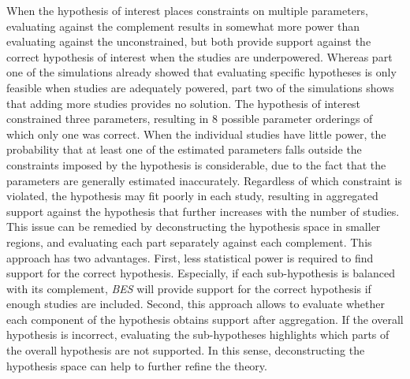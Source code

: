 \documentclass[
  authoryear,
  preprint,
  5p,
  twocolumn]{elsarticle}
\begin{document}
When the hypothesis of interest places constraints on multiple
parameters, evaluating against the complement results in somewhat more
power than evaluating against the unconstrained, but both provide
support against the correct hypothesis of interest when the studies are
underpowered. Whereas part one of the simulations already showed that
evaluating specific hypotheses is only feasible when studies are
adequately powered, part two of the simulations shows that adding more
studies provides no solution. The hypothesis of interest constrained
three parameters, resulting in 8 possible parameter orderings of which
only one was correct. When the individual studies have little power, the
probability that at least one of the estimated parameters falls outside
the constraints imposed by the hypothesis is considerable, due to the
fact that the parameters are generally estimated inaccurately.
Regardless of which constraint is violated, the hypothesis may fit
poorly in each study, resulting in aggregated support against the
hypothesis that further increases with the number of studies. This issue
can be remedied by deconstructing the hypothesis space in smaller
regions, and evaluating each part separately against each complement.
This approach has two advantages. First, less statistical power is
required to find support for the correct hypothesis. Especially, if each
sub-hypothesis is balanced with its complement, \emph{BES} will provide
support for the correct hypothesis if enough studies are included.
Second, this approach allows to evaluate whether each component of the
hypothesis obtains support after aggregation. If the overall hypothesis
is incorrect, evaluating the sub-hypotheses highlights which parts of
the overall hypothesis are not supported. In this sense, deconstructing
the hypothesis space can help to further refine the theory.
\end{document}
